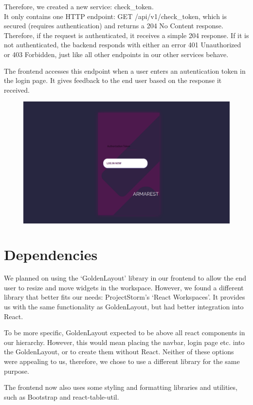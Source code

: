 Therefore, we created a new service: check\_token.\\
It only contains one HTTP endpoint: GET /api/v1/check\_token, which is secured (requires authentication) and returns a 204 No Content response.
Therefore, if the request is authenticated, it receives a simple 204 response. If it is not authenticated, 
the \gls{backend} responds with either an error 401 Unauthorized or 403 Forbidden, just like all other endpoints in our other services behave.

The \gls{frontend} accesses this endpoint when a user enters an autentication token in the login page.
It gives feedback to the end user based on the response it received.

\begin{figure}[h!]
    \centering
    \includegraphics[width=0.8\linewidth]{images/login.png}
\end{figure}

\section{Dependencies}

We planned on using the `GoldenLayout' library in our \gls{frontend} to allow the end user to resize and move widgets in the workspace.
However, we found a different library that better fits our needs: ProjectStorm's `React Workspaces'.
It provides us with the same functionality as GoldenLayout, but had better integration into React.

To be more specific, GoldenLayout expected to be above all react components in our hierarchy.
However, this would mean placing the navbar, login page etc. into the GoldenLayout, or to create them without React.
Neither of these options were appealing to us, therefore, we chose to use a different library for the same purpose.

The \gls{frontend} now also uses some styling and formatting libraries and utilities, such as Bootstrap and react-table-util.

